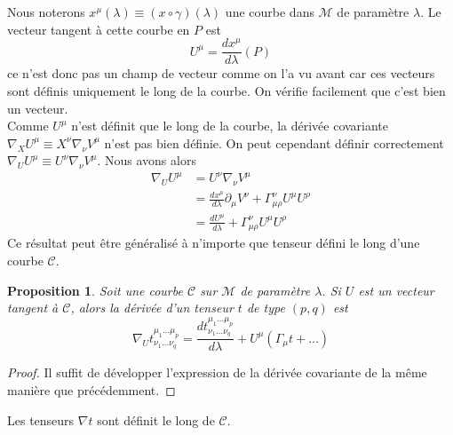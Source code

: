\documentclass[a4paper,11pt]{report}
\theoremstyle{definition}
\theoremstyle{plain}
\newtheorem{prop}[thm]{Proposition}
\theoremstyle{definition}
\theoremstyle{remark}
\newcommand{\M}{\mathscr{M}}
\newcommand{\p}{\partial}
\begin{document}
            Nous noterons $x^\mu(\lambda)\equiv (x\circ \gamma)(\lambda)$ une courbe dans $\M$ de paramètre $\lambda$. Le vecteur tangent à cette courbe en $P$ est
                \begin{equation}
                    U^\mu = \frac{dx^\mu}{d\lambda}(P)
                \end{equation}
            ce n'est donc pas un champ de vecteur comme on l'a vu avant car ces vecteurs sont définis uniquement le long de la courbe. On vérifie facilement que c'est bien un vecteur.\\
            
            Comme $U^\mu$ n'est définit que le long de la courbe, la dérivée covariante $\nabla_X U^\mu\equiv X^\nu\nabla_\nu V^\mu$ n'est pas bien définie. On peut cependant définir correctement $\nabla_U U^\mu\equiv U^\nu\nabla_\nu V^\mu$. Nous avons alors
            \begin{align}
                \nabla_U U^\mu &= U^\nu\nabla_\nu V^\mu \\
                &= \frac{dx^\mu}{d\lambda}\p_\mu V^\nu + \Gamma^\nu_{\mu\rho}U^\mu U^\rho \\
                &= \frac{dU^\mu}{d\lambda} + \Gamma^\nu_{\mu\rho} U^\mu U^\rho
            \end{align}
            Ce résultat peut être généralisé à n'importe que tenseur défini le long d'une courbe $\mathscr{C}$.
            \begin{prop}
                Soit une courbe $\mathscr{C}$ sur $\M$ de paramètre $\lambda$. Si $U$ est un vecteur tangent à $\mathscr{C}$, alors la dérivée d'un tenseur $t$ de type $(p,q)$ est
                \begin{equation}
                    \nabla_U t^{\mu_1\dots\mu_p}_{\nu_1\dots\nu_q} = \frac{dt^{\mu_1\dots\mu_p}_{\nu_1\dots\nu_q}}{d\lambda} + U^\mu(\Gamma_\mu t + \dots)
                \end{equation}
            \end{prop}
            
            \begin{proof}
                Il suffit de développer l'expression de la dérivée covariante de la même manière que précédemment.
            \end{proof}
            
            Les tenseurs $\nabla t$ sont définit le long de $\mathscr{C}$.\\
            
\end{document}
